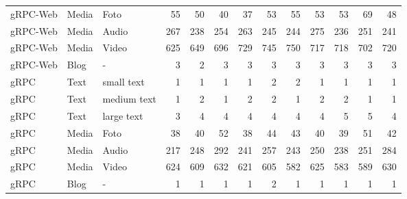 \begin{table}[p]
{\begin{tabular}{|l|l|l|*{10}{r}|}
			gRPC-Web & Media & Foto        & 55 & 50 & 40 & 37 & 53 & 55 & 53 & 53 & 69 & 48 \\
			gRPC-Web & Media & Audio       & 267 & 238 & 254 & 263 & 245 & 244 & 275 & 236 & 251 & 241 \\
			gRPC-Web & Media & Video       & 625 & 649 & 696 & 729 & 745 & 750 & 717 & 718 & 702 & 720 \\
			gRPC-Web & Blog  & -           & 3 & 2 & 3 & 3 & 3 & 3 & 3 & 3 & 3 & 3 \\
			\hline
			gRPC & Text  & small text  & 1 & 1 & 1 & 1 & 2 & 2 & 1 & 1 & 1 & 1 \\
			gRPC & Text  & medium text & 1 & 2 & 1 & 2 & 2 & 1 & 2 & 2 & 1 & 1 \\
			gRPC & Text  & large text  & 3 & 4 & 4 & 4 & 4 & 4 & 4 & 5 & 5 & 4 \\
			gRPC & Media & Foto        & 38 & 40 & 52 & 38 & 44 & 43 & 40 & 39 & 51 & 42 \\
			gRPC & Media & Audio       & 217 & 248 & 292 & 241 & 257 & 243 & 250 & 238 & 251 & 284 \\
			gRPC & Media & Video       & 624 & 609 & 632 & 621 & 605 & 582 & 625 & 583 & 589 & 630 \\
			gRPC & Blog  & -           & 1 & 1 & 1 & 1 & 2 & 1 & 1 & 1 & 1 & 1 \\
			\hline
	\end{tabular}}
\end{table}


\chapterend
